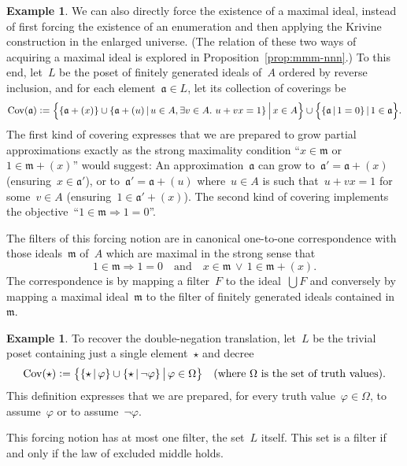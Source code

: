 \documentclass[com,11pt,crcready]{iosart2x}
\theoremstyle{definition}
\newtheorem{example}[definition]{Example}
\theoremstyle{plain}
\theoremstyle{remark}
\newcommand{\?}{\,{:}\,}
\newcommand{\aaa}{\mathfrak{a}}
\newcommand{\mmm}{\mathfrak{m}}
\newcommand{\defeq}{\vcentcolon=}
\newcommand{\Cov}{\mathrm{Cov}}
\renewcommand{\_}{\mathpunct{.}\,}
\begin{document}
\begin{example}\label{ex:notion-max}We can also directly force the existence of a maximal ideal,
instead of first forcing the existence of an enumeration and then applying the
Krivine construction in the enlarged universe. (The relation of these two ways
of acquiring a maximal ideal is explored in
Proposition~\ref{prop:mmm-nnn}.) To this end, let~$L$ be the
poset of finitely generated ideals of~$A$ ordered by reverse inclusion,
and for each element~$\aaa \in L$, let its collection of coverings be
\[\Cov(\aaa) \defeq
  \Bigl\{ \{ \aaa + (x) \} \cup \{ \aaa + (u) \,|\, u \in A, \exists v \in A\_ u + vx = 1 \}
  \,\Big|\, x \in A \Bigr\}
  \cup
  \Bigl\{ \{ \aaa \,|\, 1 = 0 \} \,|\, 1 \in \aaa \Bigr\}.
\]
The first kind of covering expresses that we are prepared to grow partial
approximations exactly as the strong maximality condition ``$x \in \mmm$ or~$1
\in \mmm + (x)$'' would suggest: An approximation~$\aaa$ can grow
to~$\aaa' = \aaa+(x)$ (ensuring~$x \in \aaa'$), or to~$\aaa' = \aaa+(u)$
where~$u \in A$ is such that~$u + vx = 1$ for some~$v \in A$ (ensuring~$1 \in
\aaa' + (x)$). The second kind of covering implements the objective~``$1 \in \mmm
\Rightarrow 1 = 0$''.

The filters of this forcing notion
are in canonical one-to-one correspondence with
those ideals~$\mmm$ of~$A$ which are maximal in the strong sense that
\[
  1 \in \mmm \Longrightarrow 1 = 0
    \quad\text{and}\quad
  x \in \mmm \,\vee\, 1 \in \mmm + (x).
\]
The correspondence is by mapping a filter~$F$ to the ideal~$\bigcup F$
and conversely by mapping a maximal ideal~$\mmm$ to the filter of finitely
generated ideals contained in~$\mmm$.
\end{example}

\begin{example}\label{ex:notion-negneg}To recover the double-negation translation, let~$L$ be the
trivial poset containing just a single element~$\star$ and decree
\[ \Cov(\star) \defeq \bigl\{ \{ \star \,|\, \varphi \} \cup \{ \star \,|\, \neg\varphi \} \,\big|\, \varphi \in \Omega \bigr\}
\quad\text{(where~$\Omega$ is the set of truth values).} \]
This definition expresses that we are prepared, for every truth value~$\varphi
\in \Omega$, to assume~$\varphi$ or to assume~$\neg\varphi$.

This forcing notion has at most one filter, the set~$L$ itself. This set is a
filter if and only if the law of excluded middle holds.
\end{example}
\end{document}
